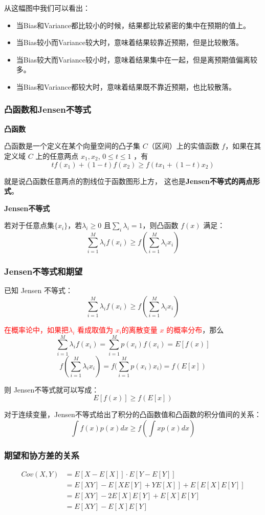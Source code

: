 \documentclass[12pt]{article}
\begin{document}
从这幅图中我们可以看出：
\begin{itemize}
    \item 当Bias和Variance都比较小的时候，结果都比较紧密的集中在预期的值上。
    \item 当Bias较小而Variance较大时，意味着结果较靠近预期，但是比较散落。
    \item 当Bias较大而Variance较小时，意味着结果集中在一起，但是离预期值偏离较多。
    \item 当Bias和Variance都较大时，意味着结果既不靠近预期，也比较散落。
\end{itemize}

\subsubsection{凸函数和Jensen不等式\cite{Understanding_Jensen_Nnequality_And_Proof}}
\textbf{凸函数}

凸函数是一个定义在某个向量空间的凸子集 $C$（区间）上的实值函数 $f$，如果在其定义域 $C$ 上的任意两点 $x_1,x_2$, $0 \le t \le 1 $ ，有
$$
tf(x_1) + (1-t)f(x_2) \ge f(tx_1 + (1-t)x_2)
$$

就是说凸函数任意两点的割线位于函数图形上方， 这也是\textbf{Jensen不等式的两点形式}。

\textbf{Jensen不等式}

若对于任意点集$\{x_i\}$，若$\lambda_i \ge 0$ 且$\sum_i\lambda_i = 1$，则凸函数 $f(x)$ 满足：
$$
\sum_{i=1}^{M}\lambda_if(x_i) \ge f(\sum_{i=1}^{M}\lambda_ix_i) 
$$

\subsubsection{Jensen不等式和期望}
已知 Jensen 不等式：
$$
\sum_{i=1}^{M}\lambda_if(x_i) \ge f(\sum_{i=1}^{M}\lambda_ix_i) 
$$

\textcolor{red}{在概率论中，如果把$\lambda_i$ 看成取值为 $x_i$的离散变量 $x$ 的概率分布}，那么 
$$
\sum_{i=1}^{M}\lambda_if(x_i) = \sum_{i=1}^Mp(x_i)f(x_i) = E[f(x)]
$$  
$$
f(\sum_{i=1}^{M}\lambda_ix_i) = f\Big(\sum_{i=1}^{M}p(x_i)x_i\Big) = f(E[x])
$$

则 Jensen不等式就可以写成：
$$
 E[f(x)] \ge f(E[x])
$$

对于连续变量，Jensen不等式给出了积分的凸函数值和凸函数的积分值间的关系：
$$
\int{f(x)p(x)dx} \ge f(\int{xp(x)dx})
$$

\subsubsection{期望和协方差的关系}
\begin{align*}
Cov(X,Y) &= E[X - E[X]]\cdot E[Y-E[Y]] \\
    &= E[XY] - E[XE[Y]+YE[X]] + E[E[X]E[Y]] \\
    &= E[XY] - 2E[X]E[Y] + E[X]E[Y] \\
    &= E[XY] - E[X]E[Y]
\end{align*}
\end{document}
